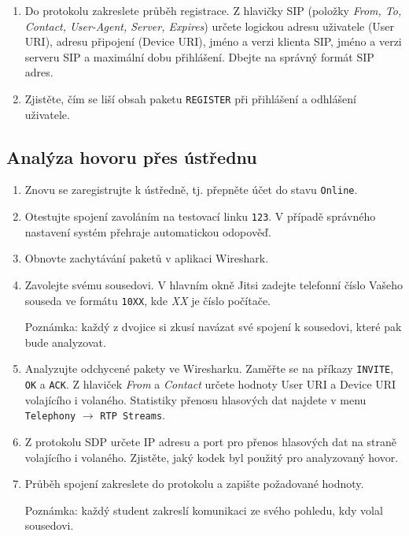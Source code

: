 \documentclass[a4paper,11pt]{article}
\begin{document}
\begin{enumerate}
      {\small Zprávy typu {\tt PUBLISH, SUBSCRIBE, OPTIONS} můžete ignorovat. Tyto správy slouží k přenosu dodatečných informací o nastavení klienta a my je nebudeme v této laboratoři používat.}
    \item Do protokolu zakreslete průběh registrace. Z hlavičky SIP (položky {\em From, To, Contact, User-Agent, Server, Expires}) určete logickou adresu uživatele (User URI), adresu připojení (Device URI), jméno a verzi klienta SIP, jméno a verzi serveru SIP a maximální dobu přihlášení. Dbejte na správný formát SIP adres.
    \item Zjistěte, čím se liší obsah paketu {\tt REGISTER} při přihlášení a odhlášení uživatele.
\end{enumerate}

\subsection{Analýza hovoru přes ústřednu}
\begin{enumerate}
  \item Znovu se zaregistrujte k ústředně, tj. přepněte účet do stavu {\tt Online}.
  \item Otestujte spojení zavoláním na testovací linku {\tt 123}. V případě správného nastavení systém přehraje automatickou odopověď. 
    \item Obnovte zachytávání paketů v aplikaci Wireshark.
    \item Zavolejte svému sousedovi. V hlavním okně Jitsi zadejte telefonní číslo Vašeho souseda ve formátu {\tt 10XX}, kde {\it XX} je číslo počítače.

    {\small Poznámka: každý z dvojice si zkusí navázat své spojení k sousedovi, které pak bude analyzovat.}
    \item Analyzujte odchycené pakety ve Wiresharku. Zaměřte se na příkazy {\tt INVITE}, {\tt OK} a {\tt ACK}. Z hlaviček {\it From} a {\it Contact} určete hodnoty User URI a Device URI volajícího i volaného. Statistiky přenosu hlasových dat najdete v menu {\tt Telephony} $\rightarrow$ {\tt RTP Streams}. 
    \item Z protokolu SDP určete IP adresu a port pro přenos hlasových dat na straně volajícího i volaného. Zjistěte, jaký kodek byl použitý pro analyzovaný hovor. 
    \item Průběh spojení zakreslete do protokolu a zapište požadované hodnoty.

      {\small Poznámka: každý student zakreslí komunikaci ze svého pohledu, kdy volal sousedovi.}
\end{enumerate}
\end{document}
